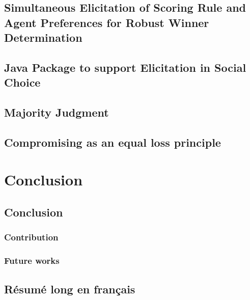 \documentclass[a4paper, 11pt,oneside]{book}
\begin{document}
	\chapter[Simultaneous Elicitation of PSR and Agent Preferences]{Simultaneous Elicitation of Scoring Rule and Agent Preferences for Robust Winner Determination}
		\label{ch:minimax}
		
	\chapter{Java Package to support Elicitation in Social Choice}
		
	\chapter{Majority Judgment}
		\label{ch:MJ}

\chapter{Compromising as an equal loss principle}
\label{ch:compromise}
	

\part{Conclusion}
	\chapter{Conclusion}
		\section{Contribution}
		\section{Future works}




\backmatter



 

\chapter{Résumé long en français}
\end{document}
